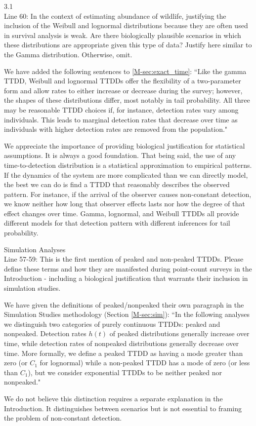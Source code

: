 \documentclass[12pt]{article}
\renewenvironment{quote}  %
              {\list{}{\rightmargin\leftmargin}\normalfont%
               \item\relax}
              {\endlist}
\begin{document}
3.1 \\
Line 60: In the context of estimating abundance of wildlife, justifying the inclusion of the Weibull and lognormal distributions because they are often used in survival analysis is weak.  Are there biologically plausible scenarios in which these distributions are appropriate given this type of data?  Justify here similar to the Gamma distribution.  Otherwise, omit.
\begin{quote}
We have added the following sentences to \ref{M-sec:exact_time}: ``Like the gamma TTDD, Weibull and lognormal TTDDs offer the flexibility of a two-parameter form and allow rates to either increase or decrease during the survey; however, the shapes of these distributions differ, most notably in tail probability.
All three may be reasonable TTDD choices if, for instance, detection rates vary among individuals.
This leads to marginal detection rates that decrease over time as individuals with higher detection rates are removed from the population."

We appreciate the importance of providing biological justification for statistical assumptions.
It is always a good foundation.
That being said, the use of any time-to-detection distribution is a statistical approximation to empirical patterns.
If the dynamics of the system are more complicated than we can directly model, the best we can do is find a TTDD that reasonably describes the observed pattern.
For instance, if the arrival of the observer causes non-constant detection, we know neither how long that observer effects lasts nor how the degree of that effect changes over time.
Gamma, lognormal, and Weibull TTDDs all provide different models for that detection pattern with different inferences for tail probability.
\end{quote}

Simulation Analyses\\
Line 57-59: This is the first mention of peaked and non-peaked TTDDs.  Please define these terms and how they are manifested during point-count surveys in the Introduction - including a biological justification that warrants their inclusion in simulation studies.
\begin{quote}
We have given the definitions of peaked/nonpeaked their own paragraph in the Simulation Studies methodology (Section \ref{M-sec:sim}):
``In the following analyses we distinguish two categories of purely continuous TTDDs: peaked and nonpeaked.  
Detection rates $h(t)$ of peaked distributions generally increase over time, while detection rates of nonpeaked distributions generally decrease over time.
More formally, we define a peaked TTDD as having a mode greater than zero (or $C_1$ for lognormal) while a non-peaked TTDD has a mode of zero (or less than $C_1$), but we consider exponential TTDDs to be neither peaked nor nonpeaked."

We do not believe this distinction requires a separate explanation in the Introduction.  It distinguishes between scenarios but is not essential to framing the problem of non-constant detection.
\end{quote}
\end{document}
